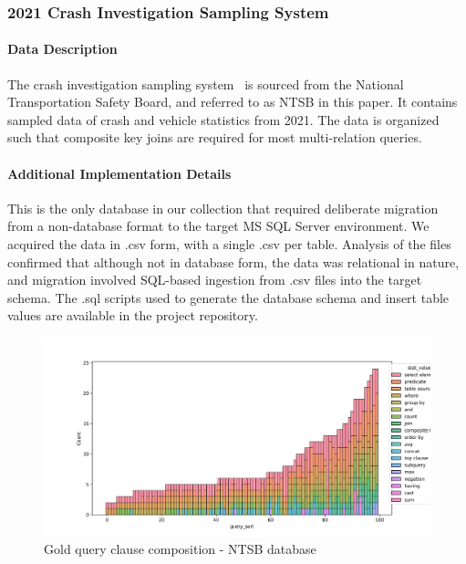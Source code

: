 \subsubsection{2021 Crash Investigation Sampling System}

\paragraph{Data Description}
The crash investigation sampling system~\cite{crash-investigation-sampling-system} is sourced from the National Transportation Safety Board, and referred to as NTSB in this paper.
It contains sampled data of crash and vehicle statistics from 2021.
The data is organized such that composite key joins are required for most multi-relation queries.

\paragraph{Additional Implementation Details}
This is the only database in our collection that required deliberate migration from a non-database format to the target MS SQL Server environment.
We acquired the data in .csv form, with a single .csv per table.
Analysis of the files confirmed that although not in database form, the data was relational in nature, and migration involved SQL-based ingestion from .csv files into the target schema.
The .sql scripts used to generate the database schema and insert table values are available in the project repository.

\begin{figure}[H]
  \centering
  \includegraphics[width=\linewidth]{figures/query-stats/NTSB-stats-clause-counts.png}
  \caption{Gold query clause composition - NTSB database}
  \label{fig:query-complexity-ntsb}
\end{figure}

